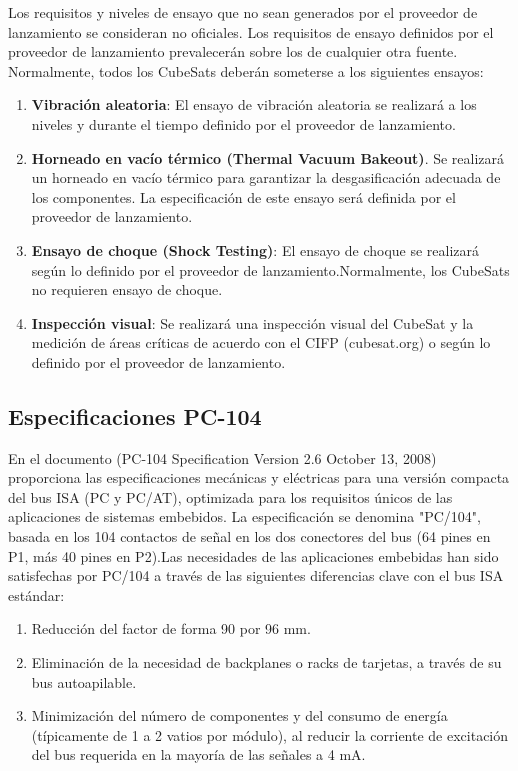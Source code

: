 \documentclass[12pt]{article}
\begin{document}
	Los requisitos y niveles de ensayo que no sean generados por el proveedor de lanzamiento se consideran no oficiales. Los requisitos de ensayo definidos por el proveedor de lanzamiento prevalecerán sobre los de cualquier otra fuente. Normalmente, todos los CubeSats deberán someterse a los siguientes ensayos:
	
	\begin{enumerate}
		\item \textbf{Vibración aleatoria}: El ensayo de vibración aleatoria se realizará a los niveles y durante el tiempo definido por el proveedor de lanzamiento.
		
		\item \textbf{Horneado en vacío térmico (Thermal Vacuum Bakeout)}. Se realizará un horneado en vacío térmico para garantizar la desgasificación adecuada de los componentes. La especificación de este ensayo será definida por el proveedor de lanzamiento.
		
		\item \textbf{Ensayo de choque (Shock Testing)}: El ensayo de choque se realizará según lo definido por el proveedor de lanzamiento.Normalmente, los CubeSats no requieren ensayo de choque.
		
		\item \textbf{Inspección visual}: Se realizará una inspección visual del CubeSat y la medición de áreas críticas de acuerdo con el CIFP (cubesat.org) o según lo definido por el proveedor de lanzamiento.
	\end{enumerate}\newpage
	
	\subsection{Especificaciones PC-104}
	En el documento (PC-104 Specification Version 2.6 October 13, 2008)  \cite{pc104:spec2008_report} proporciona las especificaciones mecánicas y eléctricas para una versión compacta del bus ISA (PC y PC/AT), optimizada para los requisitos únicos de las aplicaciones de sistemas embebidos. La especificación se denomina "PC/104", basada en los 104 contactos de señal en los dos conectores del bus (64 pines en P1, más 40 pines en P2).Las necesidades de las aplicaciones embebidas han sido satisfechas por PC/104 a través de las siguientes diferencias clave con el bus ISA estándar:
	
	\begin{enumerate}
		\item Reducción del factor de forma 90 por 96 mm. 
		
		\item Eliminación de la necesidad de backplanes o racks de tarjetas, a través de su bus autoapilable. 	
		
		\item Minimización del número de componentes y del consumo de energía (típicamente de 1 a 2 vatios por módulo), al reducir la corriente de excitación del bus requerida en la mayoría de las señales a 4 mA.
	\end{enumerate}
	
\end{document}
